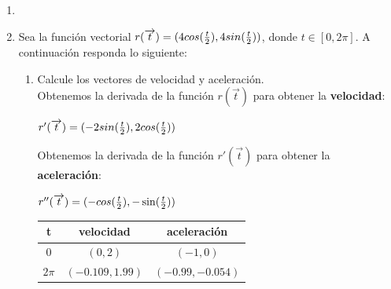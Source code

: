 \documentclass[10pt,letterpaper,fleqn]{article}
\begin{document}
    \begin{enumerate}
        \item 

        \item Sea la función vectorial $r (\overrightarrow{t}) = (4cos({t \over 2}),4sin({t \over 2}))$, donde $t \in [0,2\pi]$. A continuación responda lo siguiente:
        \begin{enumerate}
            \item Calcule los vectores de velocidad y aceleración.
            \\ Obtenemos la derivada de la función  $r (\overrightarrow{t})$ para obtener la {\bf velocidad}: 
            \begin{center}
                $r'(\overrightarrow{t}) = (-2sin({t \over 2}),2cos({t \over 2}))$ 
            \end{center}

            Obtenemos la derivada de la función $r'(\overrightarrow{t})$ para obtener la {\bf aceleración}:
            \begin{center}
                $r''(\overrightarrow{t}) = (-cos({t \over 2}),-\sin({t \over 2}))$ \\
                \begin{tabular}{|c|c|c|} \hline 
                    t & velocidad & aceleración \\ \hline
                    $0$ & $(0,2) $ & $(-1,0)$  \\ \hline
                    $2\pi$ & $(-0.109,1.99)$ & $(-0.99,-0.054)$  \\ \hline
                \end{tabular}
            \end{center}


\end{enumerate}
\end{enumerate}
\end{document}
